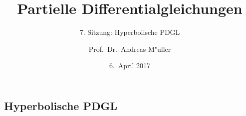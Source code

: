 \documentclass{beamer}
\title[]{Partielle Differentialgleichungen}
\subtitle{7. Sitzung: Hyperbolische PDGL}
\date[6.~April 2017]{6.~April 2017}
\author{Prof.~Dr.~Andreas M"uller}
\begin{document}
\begin{frame}
\section{Hyperbolische PDGL}
\titlepage
\end{frame}


\end{document}
